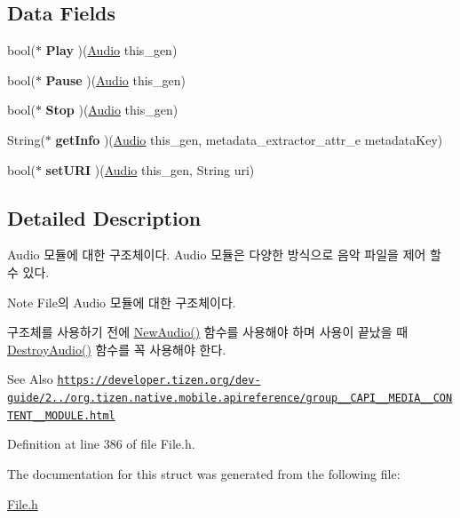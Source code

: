 \subsection*{Data Fields}
\begin{DoxyCompactItemize}
\item 
\hypertarget{struct__Audio_a2bb219bce2403c5811850073a6a69968}{bool($\ast$ {\bfseries Play} )(\hyperlink{struct__Audio}{Audio} this\-\_\-gen)}\label{struct__Audio_a2bb219bce2403c5811850073a6a69968}

\item 
\hypertarget{struct__Audio_a2835a35736608ac703201692fea14bcb}{bool($\ast$ {\bfseries Pause} )(\hyperlink{struct__Audio}{Audio} this\-\_\-gen)}\label{struct__Audio_a2835a35736608ac703201692fea14bcb}

\item 
\hypertarget{struct__Audio_a6e7eb11624ac4f8ab2babbaa568fbd03}{bool($\ast$ {\bfseries Stop} )(\hyperlink{struct__Audio}{Audio} this\-\_\-gen)}\label{struct__Audio_a6e7eb11624ac4f8ab2babbaa568fbd03}

\item 
\hypertarget{struct__Audio_af557af230def744c4b3ed69d5b3c2076}{String($\ast$ {\bfseries get\-Info} )(\hyperlink{struct__Audio}{Audio} this\-\_\-gen, metadata\-\_\-extractor\-\_\-attr\-\_\-e metadata\-Key)}\label{struct__Audio_af557af230def744c4b3ed69d5b3c2076}

\item 
\hypertarget{struct__Audio_a4d895cbd5e36ff60f5a312df2dc1431f}{bool($\ast$ {\bfseries set\-U\-R\-I} )(\hyperlink{struct__Audio}{Audio} this\-\_\-gen, String uri)}\label{struct__Audio_a4d895cbd5e36ff60f5a312df2dc1431f}

\end{DoxyCompactItemize}


\subsection{Detailed Description}
Audio 모듈에 대한 구조체이다. Audio 모듈은 다양한 방식으로 음악 파일을 제어 할 수 있다. 

\begin{DoxyNote}{Note}
File의 Audio 모듈에 대한 구조체이다. \par
 구조체를 사용하기 전에 \hyperlink{File_8h_abe7f8cf85bbeefba4700f61bc5877322}{New\-Audio()} 함수를 사용해야 하며 사용이 끝났을 때 \hyperlink{File_8h_a1c24d11e9397892d289591033dd8d174}{Destroy\-Audio()} 함수를 꼭 사용해야 한다. 
\end{DoxyNote}
\begin{DoxySeeAlso}{See Also}
\href{https://developer.tizen.org/dev-guide/2.3.0/org.tizen.native.mobile.apireference/group__CAPI__MEDIA__CONTENT__MODULE.html}{\tt https\-://developer.\-tizen.\-org/dev-\/guide/2../org.\-tizen.\-native.\-mobile.\-apireference/group\-\_\-\-\_\-\-C\-A\-P\-I\-\_\-\-\_\-\-M\-E\-D\-I\-A\-\_\-\-\_\-\-C\-O\-N\-T\-E\-N\-T\-\_\-\-\_\-\-M\-O\-D\-U\-L\-E.\-html} 
\end{DoxySeeAlso}


Definition at line 386 of file File.\-h.



The documentation for this struct was generated from the following file\-:\begin{DoxyCompactItemize}
\item 
\hyperlink{File_8h}{File.\-h}\end{DoxyCompactItemize}
